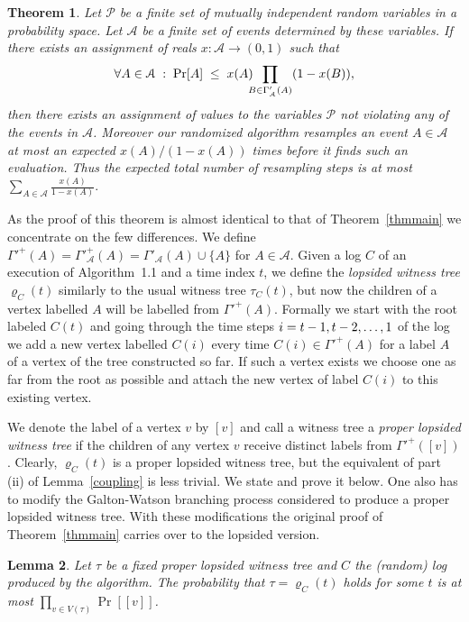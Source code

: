 \documentclass[11pt,a4paper]{article}
\newtheorem{theorem}{Theorem}[section]
\newtheorem{lemma}[theorem]{Lemma}
\DeclareMathOperator*{\pr}{Pr}
\begin{document}
\begin{theorem}
\label{lopsiversion}
Let $\mathcal P$ be a finite set of mutually independent random variables in a
probability space. Let $\mathcal{A}$ be a finite set of events determined by
these variables. If there exists an assignment of reals $x : \mathcal{A} \rightarrow (0,1)$ such that
$$ \forall A \in \mathcal{A} \; : \; \pr[A] \; \le \; x(A)
\hspace*{-0.2cm} \prod_{B \in \Gamma'_{\mathcal A}(A)} (1 - x(B)),$$
then there exists an assignment of values to the variables $\mathcal P$
not violating any of the events in $\mathcal A$. Moreover our
randomized algorithm resamples an event $A \in \mathcal{A}$ at
most an expected $x(A)/(1-x(A))$ times before it finds such an
evaluation. Thus the expected total number of resampling steps is at most
$\sum_{A \in \mathcal{A}} \frac{x(A)}{1-x(A)}.$ 
\end{theorem}

As the proof of this theorem is almost identical to that of
Theorem~\ref{thmmain} we concentrate on the few differences.
We define
$\Gamma'^+(A)=\Gamma'^+_{\mathcal{A}}(A)=\Gamma'_{\mathcal{A}}(A)\cup\{A\}$ for
$A\in\mathcal{A}$.
Given a log $C$ of an execution of Algorithm~1.1 and a time index $t$, we
define the \emph{lopsided witness tree} $\varrho_C(t)$ similarly to the
usual witness tree $\tau_C(t)$, but now the children of a
vertex labelled $A$ will be labelled from $\Gamma'^+(A)$. Formally we start
with the root labeled $C(t)$ and going through the time steps $i=t-1, t-2,
\mathellipsis, 1$ of the log we add a new vertex labelled $C(i)$ every time
$C(i)\in\Gamma'^+(A)$ for a label $A$ of a vertex of the tree constructed so
far. If such a vertex exists we
choose one as far from the root as possible and
attach the new vertex of label $C(i)$ to this existing vertex.

We denote the label of a vertex $v$ by $[v]$ and call a witness tree a {\em
proper lopsided witness tree} if the children of any vertex $v$ receive
distinct labels from $\Gamma'^+([v])$.
Clearly, $\varrho_C(t)$ is a proper lopsided witness tree, but the equivalent
of part (ii) of Lemma~\ref{coupling} is less trivial. We state and prove it
below. One also has to modify the Galton-Watson branching
process considered to produce a proper lopsided witness tree. With these
modifications the original proof of Theorem~\ref{thmmain} carries over to the
lopsided version.

\begin{lemma}\label{loplemma}
Let $\tau$ be a fixed proper lopsided witness tree and $C$ the (random) log
produced by the algorithm. The probability that $\tau=\varrho_C(t)$ holds for
some $t$ is at most $\prod_{v\in V(\tau)}\pr[[v]]$.
\end{lemma}
\end{document}
